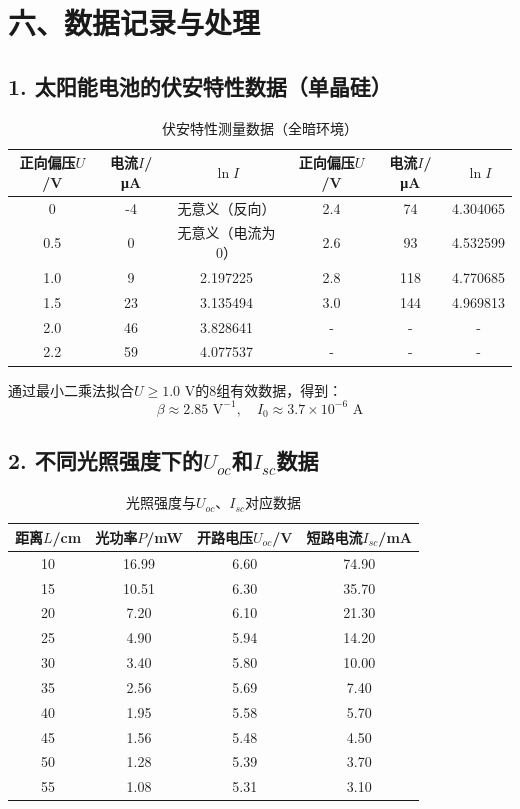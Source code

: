 \documentclass[12pt]{article}
\begin{document}
\section{六、数据记录与处理}
\subsection{1. 太阳能电池的伏安特性数据（单晶硅）}
\begin{table}[h]
\centering
\caption{伏安特性测量数据（全暗环境）}
\begin{tabular}{|c|c|c|c|c|c|}
\hline
正向偏压$U$/V & 电流$I$/μA & $\ln I$ & 正向偏压$U$/V & 电流$I$/μA & $\ln I$ \\
\hline
0 & -4 & 无意义（反向） & 2.4 & 74 & 4.304065 \\
0.5 & 0 & 无意义（电流为0） & 2.6 & 93 & 4.532599 \\
1.0 & 9 & 2.197225 & 2.8 & 118 & 4.770685 \\
1.5 & 23 & 3.135494 & 3.0 & 144 & 4.969813 \\
2.0 & 46 & 3.828641 & - & - & - \\
2.2 & 59 & 4.077537 & - & - & - \\
\hline
\end{tabular}
\end{table}

通过最小二乘法拟合$U \geq 1.0$ V的8组有效数据，得到：
$$\beta \approx 2.85 \text{ V}^{-1}, \quad I_0 \approx 3.7 \times 10^{-6} \text{ A}$$

\subsection{2. 不同光照强度下的$U_{oc}$和$I_{sc}$数据}
\begin{table}[h]
\centering
\caption{光照强度与$U_{oc}$、$I_{sc}$对应数据}
\begin{tabular}{|c|c|c|c|}
\hline
距离$L$/cm & 光功率$P$/mW & 开路电压$U_{oc}$/V & 短路电流$I_{sc}$/mA \\
\hline
10 & 16.99 & 6.60 & 74.90 \\
15 & 10.51 & 6.30 & 35.70 \\
20 & 7.20 & 6.10 & 21.30 \\
25 & 4.90 & 5.94 & 14.20 \\
30 & 3.40 & 5.80 & 10.00 \\
35 & 2.56 & 5.69 & 7.40 \\
40 & 1.95 & 5.58 & 5.70 \\
45 & 1.56 & 5.48 & 4.50 \\
50 & 1.28 & 5.39 & 3.70 \\
55 & 1.08 & 5.31 & 3.10 \\
\hline
\end{tabular}
\end{table}
\end{document}
